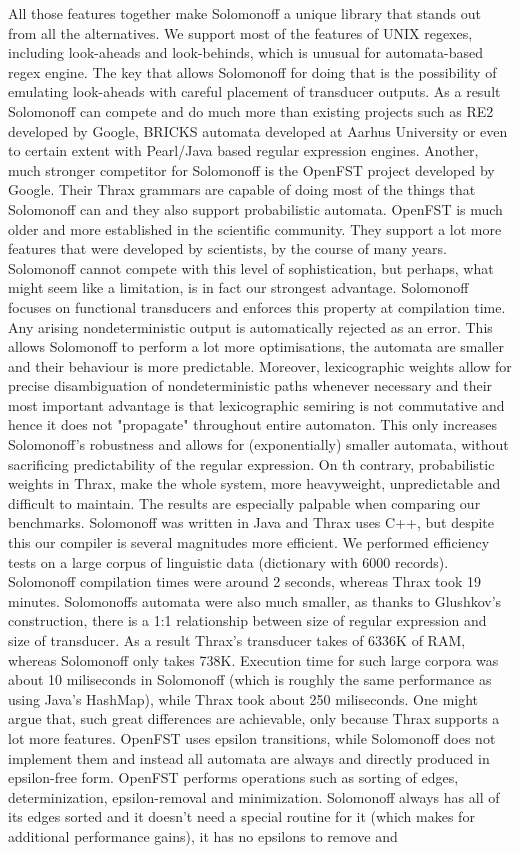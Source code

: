 All those features together make Solomonoff a unique library that stands out from all the alternatives. We support most of the features of UNIX regexes, including look-aheads and look-behinds, which is unusual for automata-based regex engine. The key that allows Solomonoff for doing that is the possibility of emulating look-aheads with careful placement of transducer outputs. As a result Solomonoff can compete and  do much more than existing projects such as RE2 developed by Google, BRICKS automata developed at  Aarhus University or even to certain extent with Pearl/Java based regular expression engines. Another, much stronger competitor for Solomonoff is the OpenFST project developed by Google. Their Thrax grammars are capable of doing most of the things that Solomonoff can and they also support probabilistic automata. OpenFST is much older and more established in the scientific community. They support a lot more features that were developed by scientists, by the course of many years. Solomonoff cannot compete with this level of sophistication, but perhaps, what might seem like a limitation, is in fact our strongest advantage. Solomonoff focuses on functional transducers and enforces this property at compilation time. Any arising nondeterministic output is automatically rejected as an error. This allows Solomonoff to perform a lot more optimisations, the automata are smaller and their behaviour is more predictable. Moreover, lexicographic weights allow for precise disambiguation of nondeterministic paths whenever necessary and their most important advantage is that lexicographic semiring is not commutative and hence it does not "propagate" throughout entire automaton. This only increases Solomonoff's robustness and allows for (exponentially) smaller automata, without sacrificing predictability of the regular expression. On th contrary, probabilistic weights in Thrax, make the whole system, more heavyweight, unpredictable and difficult to maintain. The results are especially palpable when comparing our benchmarks. Solomonoff was written in Java and Thrax uses C++, but despite this our compiler is several magnitudes more efficient. We performed efficiency tests on a large corpus of linguistic data (dictionary with 6000 records). Solomonoff compilation times were around 2 seconds, whereas Thrax took 19 minutes. Solomonoffs automata were also much smaller, as thanks to Glushkov's construction, there is a 1:1 relationship between size of regular expression and size of transducer. As a result Thrax's transducer takes of 6336K of RAM, whereas Solomonoff only takes 738K. Execution time for such large corpora was about 10 miliseconds in Solomonoff (which is roughly the same performance as using Java's HashMap), while Thrax took about 250 miliseconds. One might argue that, such great differences are achievable, only because Thrax supports a lot more features. OpenFST uses epsilon transitions, while Solomonoff does not implement them and instead all automata are always and directly produced in epsilon-free form. OpenFST performs operations such as sorting of edges, determinization, epsilon-removal and minimization. Solomonoff always has all of its edges sorted and it doesn't need a special routine for it (which makes for additional performance gains), it has no epsilons to remove and 
